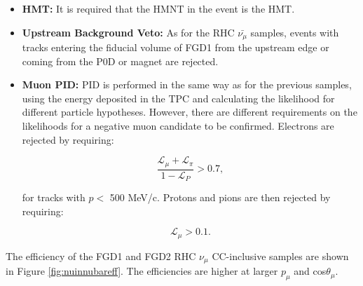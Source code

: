 \begin{itemize}

\item \textbf{HMT:} It is required that the HMNT in the event is the HMT.

\item \textbf{Upstream Background Veto:} As for the RHC $\bar{\nu_{\mu}}$ samples, events with tracks entering the fiducial volume of FGD1 from the upstream edge or coming from the P0D or magnet are rejected.

\item \textbf{Muon PID:} PID is performed in the same way as for the previous samples, using the energy deposited in the TPC and calculating the likelihood for different particle hypotheses. However, there are different requirements on the likelihoods for a negative muon candidate to be confirmed. Electrons are rejected by requiring:

\begin{equation}
\frac{\mathcal{L}_{\mu}+\mathcal{L}_{\pi}}{1-\mathcal{L}_P} > 0.7,
\end{equation}

for tracks with  $p <$ 500 MeV/c. Protons and pions are then rejected by requiring:

\begin{equation}
\mathcal{L}_{\mu} > 0.1.
\end{equation}

\end{itemize}

The efficiency of the FGD1 and FGD2 RHC $\nu_{\mu}$ CC-inclusive samples are shown in Figure \ref{fig:nuinnubareff}. The efficiencies are higher at larger $p_{\mu}$ and cos$\theta_{\mu}$.

